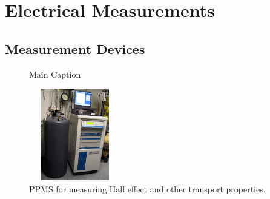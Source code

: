 \section{Electrical Measurements}\label{sec:measurements}
\subsection{Measurement Devices}\label{subsec:measurement_devices}
\begin{figure}[ht]
	\centering
	\qquad
	\caption[Measurement setup]{Main Caption}
	\label{fig:measurement}
\end{figure}

\begin{figure}[ht]
	\centering
	\includegraphics[height=4cm,width=4cm]{figs/experimental/ppms}
	\caption[Physical property measurement system]{\ac{PPMS} for measuring Hall effect and other transport properties.}
	\label{fig:ppms}
\end{figure}

